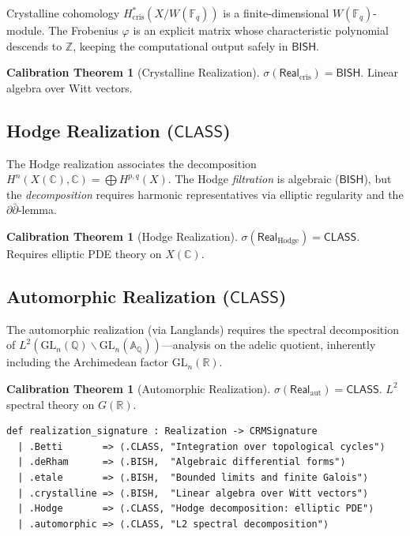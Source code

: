 \documentclass[11pt,a4paper]{article}
\theoremstyle{plain}
\theoremstyle{definition}
\newtheorem{calibration}[theorem]{Calibration Theorem}
\newcommand{\BISH}{\textsf{BISH}}
\newcommand{\CLASS}{\textsf{CLASS}}
\newcommand{\Real}{\mathsf{Real}}
\newcommand{\sig}{\sigma}
\newcommand{\Z}{\mathbb{Z}}
\newcommand{\Q}{\mathbb{Q}}
\newcommand{\R}{\mathbb{R}}
\newcommand{\C}{\mathbb{C}}
\newcommand{\F}{\mathbb{F}}
\newcommand{\A}{\mathbb{A}}
\newcommand{\GL}{\mathrm{GL}}
\begin{document}
Crystalline cohomology $H^*_{\mathrm{cris}}(X/W(\F_q))$ is a finite-dimensional $W(\F_q)$-module. The Frobenius $\varphi$ is an explicit matrix whose characteristic polynomial descends to $\Z$, keeping the computational output safely in $\BISH$.

\begin{calibration}[Crystalline Realization]\label{cal:crys}
$\sig(\Real_{\mathrm{cris}}) = \BISH$. Linear algebra over Witt vectors.
\end{calibration}

\subsection{Hodge Realization ($\CLASS$)}

The Hodge realization associates the decomposition $H^n(X(\C), \C) = \bigoplus H^{p,q}(X)$. The Hodge \emph{filtration} is algebraic ($\BISH$), but the \emph{decomposition} requires harmonic representatives via elliptic regularity and the $\partial\bar\partial$-lemma.

\begin{calibration}[Hodge Realization]\label{cal:hodge}
$\sig(\Real_{\mathrm{Hodge}}) = \CLASS$. Requires elliptic PDE theory on $X(\C)$.
\end{calibration}

\subsection{Automorphic Realization ($\CLASS$)}

The automorphic realization (via Langlands) requires the spectral decomposition of $L^2(\GL_n(\Q)\backslash\GL_n(\A_\Q))$---analysis on the adelic quotient, inherently including the Archimedean factor $\GL_n(\R)$.

\begin{calibration}[Automorphic Realization]\label{cal:auto}
$\sig(\Real_{\mathrm{aut}}) = \CLASS$. $L^2$ spectral theory on $G(\R)$.
\end{calibration}

\begin{tcolorbox}[leanbox={Lean: Realization signatures}]
\begin{Verbatim}[fontsize=\small]
def realization_signature : Realization -> CRMSignature
  | .Betti       => ⟨.CLASS, "Integration over topological cycles"⟩
  | .deRham      => ⟨.BISH,  "Algebraic differential forms"⟩
  | .etale       => ⟨.BISH,  "Bounded limits and finite Galois"⟩
  | .crystalline => ⟨.BISH,  "Linear algebra over Witt vectors"⟩
  | .Hodge       => ⟨.CLASS, "Hodge decomposition: elliptic PDE"⟩
  | .automorphic => ⟨.CLASS, "L2 spectral decomposition"⟩
\end{Verbatim}
\end{tcolorbox}
\end{document}
